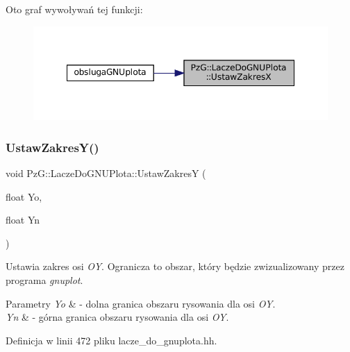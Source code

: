 Oto graf wywoływań tej funkcji\+:\nopagebreak
\begin{figure}[H]
\begin{center}
\leavevmode
\includegraphics[width=348pt]{class_pz_g_1_1_lacze_do_g_n_u_plota_a9c91987dfc869d6fcea96205c581daef_icgraph}
\end{center}
\end{figure}
\mbox{\label{class_pz_g_1_1_lacze_do_g_n_u_plota_a54c6e9cf9ab2eae479451fd953c2717c}} 
\subsubsection{\texorpdfstring{UstawZakresY()}{UstawZakresY()}}
{\footnotesize\ttfamily void Pz\+G\+::\+Lacze\+Do\+G\+N\+U\+Plota\+::\+Ustaw\+ZakresY (\begin{DoxyParamCaption}\item[{float}]{Yo,  }\item[{float}]{Yn }\end{DoxyParamCaption})\hspace{0.3cm}{\ttfamily [inline]}}

Ustawia zakres osi {\itshape OY}. Ogranicza to obszar, który będzie zwizualizowany przez programa {\itshape gnuplot}. 
\begin{DoxyParams}{Parametry}
{\em Yo} & -\/ dolna granica obszaru rysowania dla osi {\itshape OY}. \\
\hline
{\em Yn} & -\/ górna granica obszaru rysowania dla osi {\itshape OY}. \\
\hline
\end{DoxyParams}


Definicja w linii 472 pliku lacze\+\_\+do\+\_\+gnuplota.\+hh.


